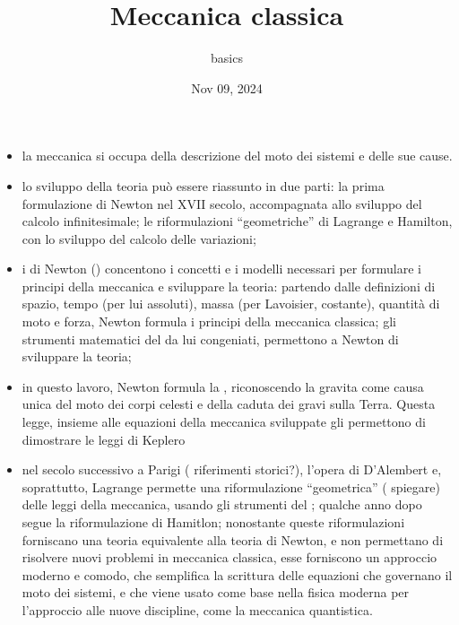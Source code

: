 \documentclass[letterpaper,10pt,english]{jupyterBook}
\title{Meccanica classica}
\date{Nov 09, 2024}
\author{basics}
\begin{document}
\pagestyle{empty}
\sphinxmaketitle
\pagestyle{plain}
\sphinxtableofcontents
\pagestyle{normal}
\label{\detokenize{intro::doc}}


\sphinxAtStartPar
{}
\begin{itemize}
\item {} 
\sphinxAtStartPar
la meccanica si occupa della descrizione del moto dei sistemi e delle sue cause.

\item {} 
\sphinxAtStartPar
lo sviluppo della teoria può essere riassunto in due parti: la prima formulazione di Newton nel XVII secolo, accompagnata allo sviluppo del calcolo infinitesimale; le riformulazioni “geometriche” di Lagrange e Hamilton, con lo sviluppo del calcolo delle variazioni;

\item {} 
\sphinxAtStartPar
i  di Newton () concentono i concetti e i modelli necessari per formulare i principi della meccanica e sviluppare la teoria: partendo dalle definizioni di spazio, tempo (per lui assoluti), massa (per Lavoisier, costante), quantità di moto e forza, Newton formula i principi della meccanica classica; gli strumenti matematici del  da lui congeniati, permettono a Newton di sviluppare la teoria;

\item {} 
\sphinxAtStartPar
in questo lavoro, Newton formula la , riconoscendo la gravita come causa unica del moto dei corpi celesti e della caduta dei gravi sulla Terra. Questa legge, insieme alle equazioni della meccanica sviluppate gli permettono di dimostrare le leggi di Keplero

\item {} 
\sphinxAtStartPar
nel secolo successivo a Parigi ( riferimenti storici?), l’opera di D’Alembert e, soprattutto, Lagrange permette una riformulazione “geometrica” ( spiegare) delle leggi della meccanica, usando gli strumenti del ; qualche anno dopo segue la riformulazione di Hamitlon; nonostante queste riformulazioni forniscano una teoria equivalente alla teoria di Newton, e non permettano di risolvere nuovi problemi in meccanica classica, esse forniscono un approccio moderno e comodo, che semplifica la scrittura delle equazioni che governano il moto dei sistemi, e che viene usato come base nella fisica moderna per l’approccio alle nuove discipline, come la meccanica quantistica.

\end{itemize}
\end{document}
